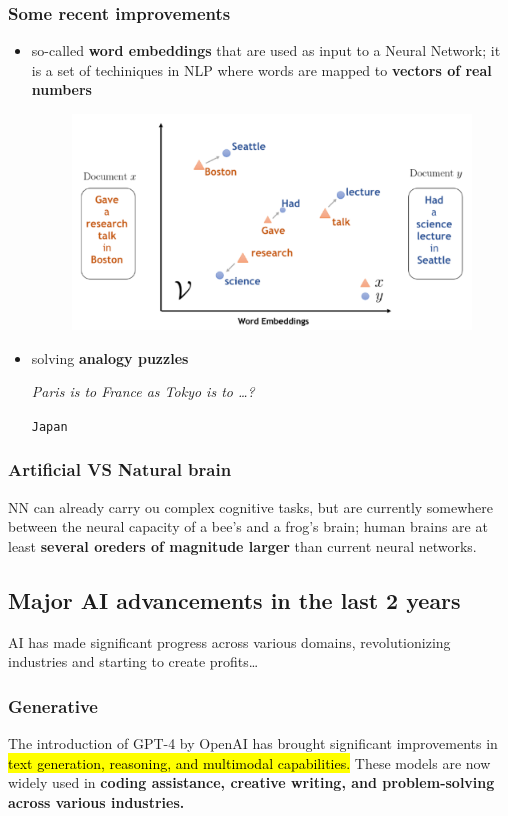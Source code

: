 \subsubsection{Some recent improvements}
\begin{itemize}
    \item so-called \textbf{word embeddings} that are used as input to a Neural Network; it is 
    a set of techiniques in NLP where words are mapped to \textbf{vectors of real numbers}

    \begin{figure}[H]
        \centering
        \includegraphics[width=0.6\linewidth]{01/images/word-embeddings.png}
    \end{figure}
    \item solving \textbf{analogy puzzles}
    
    \textit{Paris is to France as Tokyo is to \dots?}

    \texttt{Japan}
\end{itemize}


\subsubsection{Artificial VS Natural brain}

NN can already carry ou complex cognitive tasks, but are currently somewhere between 
the neural capacity of a bee's and a frog's brain; human brains are at least \textbf{several oreders 
of magnitude larger} than current neural networks.


\subsection{Major AI advancements in the last 2 years}
AI has made significant progress across various domains, revolutionizing 
industries and starting to create profits\dots

\subsubsection{Generative}
The introduction of GPT-4 by OpenAI has brought significant improvements in \hl{text 
generation, reasoning, and multimodal capabilities.} These models are now widely used 
in \textbf{coding assistance, creative writing, and problem-solving across various 
industries.}

